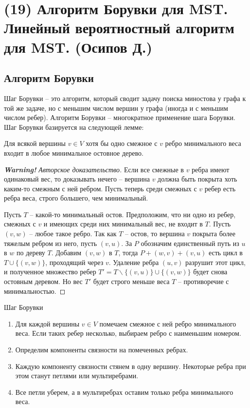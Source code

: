 \section{(19) Алгоритм Борувки для MST. Линейный вероятностный алгоритм для MST. (Осипов Д.)}

\newcommand{\achtung}{\color{red}\textbf{Warning!} Авторское доказательство}

\subsection{Алгоритм Борувки}
Шаг Борувки -- это алгоритм, который сводит задачу поиска миностова у графа к той же задаче, но с меньшим числом вершин у графа (иногда и с меньшим числом ребер). Алгоритм Борувки -- многократное применение шага Борувки. Шаг Борувки базируется на следующей лемме:

\begin{lemma*} Для всякой вершины $v \in V$ хотя бы одно смежное с $v$ ребро минимального веса входит в любое минимальное остовное дерево. \end{lemma*}
\begin{proof}[\achtung]
Если все смежные в $v$ ребра имеют одинаковый вес, то доказывать нечего -- вершина $v$ должна быть покрыта хоть каким-то смежным с ней ребром. Пусть теперь среди смежных с $v$ ребер есть ребра веса, строго большего, чем минимальный.

Пусть $T$ -- какой-то минимальный остов. Предположим, что ни одно из ребер, смежных с $v$ и имеющих среди них минимальный вес, не входит в $T$. Пусть $(v, w)$ -- любое такое ребро. Так как $T$ -- остов, то вершина $v$ покрыта более тяжелым ребром из него, пусть $(v, u)$. За $P$ обозначим единственный путь из $u$ в $w$ по дереву $T$. Добавим $(v, w)$ в $T$, тогда $P + (w, v) + (v, u)$ есть цикл в $T\cup\{(v, w)\}$, проходящий через $v$. Удаление ребра $(u, v)$ разрушит этот цикл, и полученное множество ребер $T' = T\smallsetminus \{(v, u)\} \cup \{(v, w)\}$ будет снова остовным деревом. Но вес $T'$ будет строго меньше веса $T$ -- противоречие с минимальностью.
\end{proof}

\begin{algodescription}{Шаг Борувки}
\begin{enumerate}
    \item Для каждой вершины $v \in V$ помечаем смежное с ней ребро минимального веса. Если таких ребер несколько, выбираем ребро с наименьшим номером.
    \item Определим компоненты связности на помеченных ребрах.
    \item Каждую компоненту связности стянем в одну вершину. Некоторые ребра при этом станут петлями или мультиребрами.
    \item Все петли уберем, а в мультиребрах оставим только ребра минимального веса.
\end{enumerate}
\end{algodescription}

